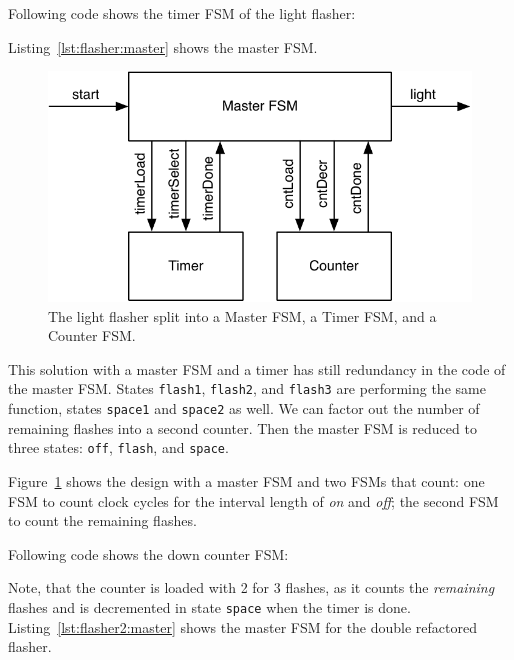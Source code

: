 \documentclass[%
    10pt,
    headinclude, footexclude,
    openright, %
    notitlepage,
    cleardoubleempty,
    headsepline,
    pointlessnumbers,
    bibtotoc, idxtotoc,
    ]{scrbook}
\newcommand{\code}[1]{{\small{\texttt{#1}}}}
\newcommand{\scale}{0.7}
\begin{document}
\noindent Following code shows the timer FSM of the light flasher:


\noindent Listing~\ref{lst:flasher:master} shows the master FSM.


\begin{figure}
  \centering
  \includegraphics[scale=\scale]{figures/flasher2}
  \caption{The light flasher split into a Master FSM, a Timer FSM, and a Counter FSM.}
  \label{fig:flasher2}
\end{figure}

This solution with a master FSM and a timer has still redundancy in the code
of the master FSM. States \code{flash1}, \code{flash2}, and \code{flash3}
are performing the same function, states \code{space1} and \code{space2} as well.
We can factor out the number of remaining flashes into a second counter.
Then the master FSM is reduced to three states: \code{off}, \code{flash},
and \code{space}.

Figure~\ref{fig:flasher2} shows the design with a master FSM and two FSMs
that count: one FSM to count clock cycles for the interval length of \emph{on}
and \emph{off}; the second FSM to count the remaining flashes.

Following code shows the down counter FSM:


\noindent Note, that the counter is loaded with 2 for 3 flashes, as it counts the
\emph{remaining} flashes and is decremented in state \code{space} when the timer
is done. Listing~\ref{lst:flasher2:master} shows the master FSM for the double refactored flasher.
\end{document}
